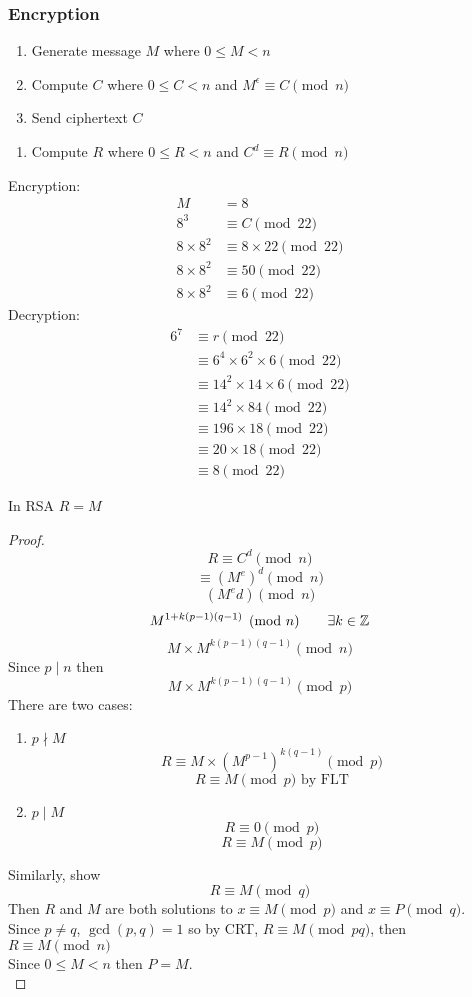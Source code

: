 \documentclass[english, 12pt]{article}
\begin{document}
\subsubsection*{Encryption}
\begin{enumerate}
\item Generate message $M$ where $ 0 \leq M < n$
\item Compute $C$ where $ 0 \leq C < n$ and $M^\epsilon \equiv C \pmod n$
\item Send ciphertext $C$
\end{enumerate}
\begin{enumerate}
\item Compute $R$ where $0 \leq R < n$ and $C^d \equiv R \pmod n$
\end{enumerate}
\begin{exmp}
Encryption:
\begin{align*}
M &= 8 \\
8^3 &\equiv C \pmod {22} \\
8\times 8 ^2 &\equiv 8\times 22 \pmod {22} \\
8\times 8 ^2  &\equiv 50 \pmod {22} \\
8\times 8 ^2  &\equiv 6 \pmod {22} 
\end{align*}
Decryption:
\begin{align*}
6^7 &\equiv r \pmod{22} \\
&\equiv 6^4 \times 6^2 \times 6 \pmod{22}\\
&\equiv 14^2 \times 14 \times 6 \pmod{22} \\
&\equiv 14^2 \times 84 \pmod{22} \\
&\equiv 196 \times 18 \pmod{22} \\
&\equiv 20 \times 18 \pmod{22} \\
&\equiv 8 \pmod{22} 
\end{align*}
\end{exmp}
\begin{thrm}[RSA]
In RSA $R = M$
\begin{proof}
\[R \equiv C^d \pmod n \]
\[\equiv (M^e)^d \pmod n \]
\[ (M^ed) \pmod n \]
\[M^{1+k(p-1)(q-1)} \pmod n \qquad \exists k \in {\mathbb{Z}}\]
\[M\times M^{k(p-1)(q-1)} \pmod n \]
Since $p \mid n$ then
\[M\times M^{k(p-1)(q-1)} \pmod p \]
There are two cases:
\begin{enumerate}
\item $p \nmid M$
\[R \equiv M\times (M^{p-1})^{k(q-1)} \pmod p\]
\[ R \equiv M \pmod p \text{ by FLT}\]
\item $p \mid M$
\[ R \equiv 0 \pmod p \]
\[R \equiv M \pmod p \]
\end{enumerate}
Similarly, show 
\[R \equiv M \pmod q \]
Then $R$ and $M$ are both solutions to $x \equiv M \pmod p$ and $x \equiv P \pmod q$.\\
Since $p \neq q$, $\gcd(p,q) = 1$ so by CRT, $R \equiv M \pmod{pq}$, then $R \equiv M \pmod{n}$\\
Since $0 \leq M < n$ then $P = M$.\\
\end{proof}
\end{thrm}
\end{document}
